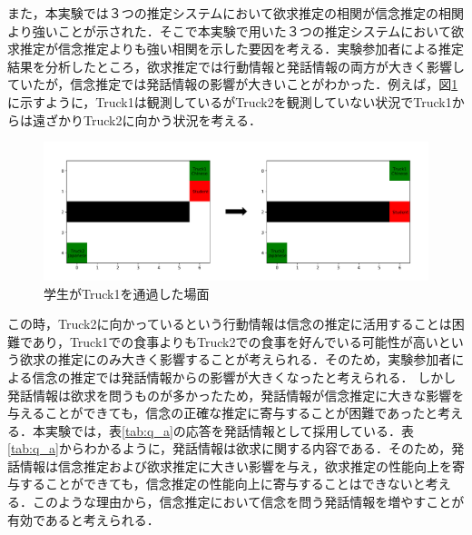 \par
また，本実験では３つの推定システムにおいて欲求推定の相関が信念推定の相関より強いことが示された．そこで本実験で用いた３つの推定システムにおいて欲求推定が信念推定よりも強い相関を示した要因を考える．実験参加者による推定結果を分析したところ，欲求推定では行動情報と発話情報の両方が大きく影響していたが，信念推定では発話情報の影響が大きいことがわかった．例えば，図\ref{fig:ex_env3}に示すように，Truck1は観測しているがTruck2を観測していない状況でTruck1からは遠ざかりTruck2に向かう状況を考える．
\begin{figure}[htbp]
  \begin{center}
    \includegraphics[scale=0.48]{./ex_env3.pdf}
    \caption{学生がTruck1を通過した場面}
    \label{fig:ex_env3}
  \end{center}
\end{figure}
この時，Truck2に向かっているという行動情報は信念の推定に活用することは困難であり，Truck1での食事よりもTruck2での食事を好んでいる可能性が高いという欲求の推定にのみ大きく影響することが考えられる．そのため，実験参加者による信念の推定では発話情報からの影響が大きくなったと考えられる．
しかし発話情報は欲求を問うものが多かったため，発話情報が信念推定に大きな影響を与えることができても，信念の正確な推定に寄与することが困難であったと考える．本実験では，表\ref{tab:q_a}の応答を発話情報として採用している．表\ref{tab:q_a}からわかるように，発話情報は欲求に関する内容である．そのため，発話情報は信念推定および欲求推定に大きい影響を与え，欲求推定の性能向上を寄与することができても，信念推定の性能向上に寄与することはできないと考える．このような理由から，信念推定において信念を問う発話情報を増やすことが有効であると考えられる．
